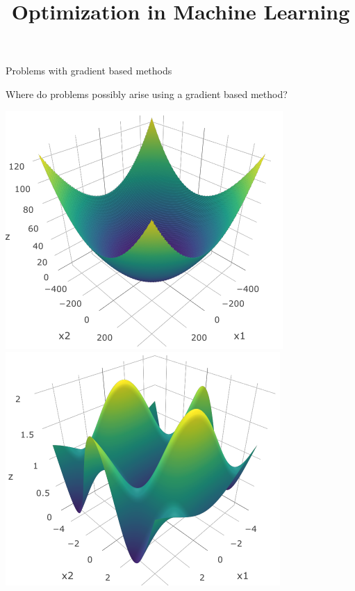 \documentclass[11pt,compress,t,notes=noshow, xcolor=table]{beamer}
\title{Optimization in Machine Learning}
\date{}
\begin{document}
\sloppy

\begin{vbframe}{Problems with gradient based methods}

Where do problems possibly arise using a gradient based method?







\vspace{0.3cm}
\begin{center}
\includegraphics[width = 0.45\linewidth]{figure_man/griewank1.png} ~~~ \includegraphics[width = 0.45\linewidth]{figure_man/griewank3.png}
\end{center}


\end{vbframe}
\end{document}
